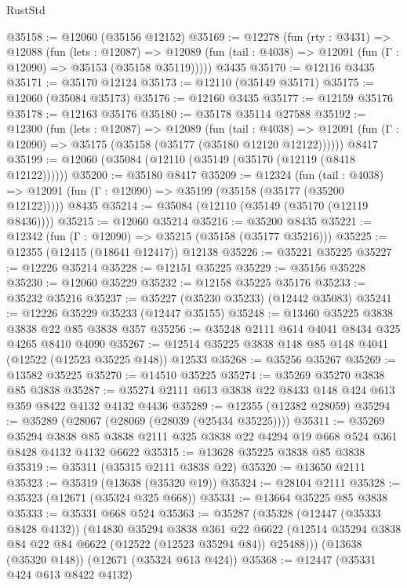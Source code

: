 \begin{lexlean}{RustStd}
\begin{coremodule}
@35158 := @12060 (@35156 @12152)
@35169 := @12278
    (fun (rty : @3431) =>
    @12088
      (fun (lets : @12087) =>
      @12089 (fun (tail : @4038) => @12091 (fun (Γ : @12090) => @35153 (@35158 @35119)))))
    @3435
@35170 := @12116 @3435
@35171 := @35170 @12124
@35173 := @12110 (@35149 @35171)
@35175 := @12060 (@35084 @35173)
@35176 := @12160 @3435
@35177 := @12159 @35176
@35178 := @12163 @35176
@35180 := @35178 @35114 @27588
@35192 := @12300
    (fun (lets : @12087) =>
    @12089
      (fun (tail : @4038) =>
      @12091 (fun (Γ : @12090) => @35175 (@35158 (@35177 (@35180 @12120 @12122))))))
    @8417
@35199 := @12060 (@35084 (@12110 (@35149 (@35170 (@12119 (@8418 @12122))))))
@35200 := @35180 @8417
@35209 := @12324
    (fun (tail : @4038) => @12091 (fun (Γ : @12090) => @35199 (@35158 (@35177 (@35200 @12122)))))
    @8435
@35214 := @35084 (@12110 (@35149 (@35170 (@12119 @8436))))
@35215 := @12060 @35214
@35216 := @35200 @8435
@35221 := @12342 (fun (Γ : @12090) => @35215 (@35158 (@35177 @35216)))
@35225 := @12355 (@12415 (@18641 @12417)) @12138
@35226 := @35221 @35225
@35227 := @12226 @35214
@35228 := @12151 @35225
@35229 := @35156 @35228
@35230 := @12060 @35229
@35232 := @12158 @35225 @35176
@35233 := @35232 @35216
@35237 := @35227 (@35230 @35233) (@12442 @35083)
@35241 := @12226 @35229 @35233 (@12447 @35155)
@35248 := @13460 @35225 @3838 @3838 @22 @85 @3838 @357
@35256 := @35248 @2111 @614 @4041 @8434 @325 @4265 @8410 @4090
@35267 := @12514 @35225 @3838 @148 @85 @148 @4041 (@12522 (@12523 @35225 @148)) @12533
@35268 := @35256 @35267
@35269 := @13582 @35225
@35270 := @14510 @35225
@35274 := @35269 @35270 @3838 @85 @3838
@35287 := @35274 @2111 @613 @3838 @22 @8433 @148 @424 @613 @359 @8422 @4132 @4132 @4436
@35289 := @12355 (@12382 @28059)
@35294 := @35289 (@28067 (@28069 (@28039 (@25434 @35225))))
@35311 := @35269
    @35294
    @3838
    @85
    @3838
    @2111
    @325
    @3838
    @22
    @4294
    @19
    @668
    @524
    @361
    @8428
    @4132
    @4132
    @6622
@35315 := @13628 @35225 @3838 @85 @3838
@35319 := @35311 (@35315 @2111 @3838 @22)
@35320 := @13650 @2111
@35323 := @35319 (@13638 (@35320 @19))
@35324 := @28104 @2111
@35328 := @35323 (@12671 (@35324 @325 @668))
@35331 := @13664 @35225 @85 @3838
@35333 := @35331 @668 @524
@35363 := @35287
    (@35328
      (@12447 (@35333 @8428 @4132))
      (@14830
        @35294
        @3838
        @361
        @22
        @6622
        (@12514 @35294 @3838 @84 @22 @84 @6622 (@12522 (@12523 @35294 @84)) @25488)))
    (@13638 (@35320 @148))
    (@12671 (@35324 @613 @424))
@35368 := @12447 (@35331 @424 @613 @8422 @4132)

\end{coremodule}
\end{lexlean}
